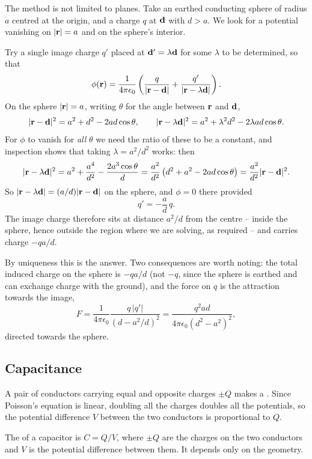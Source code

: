 \documentclass[a4paper]{scrartcl}
\begin{document}
\begin{example}
	The method is not limited to planes. Take an earthed conducting sphere of radius $a$ centred at the origin, and a charge $q$ at $\mathbf{d}$ with $d > a$. We look for a potential vanishing on $|\mathbf{r}| = a$ and on the sphere's interior.

	Try a single image charge $q'$ placed at $\mathbf{d}' = \lambda \mathbf{d}$ for some $\lambda$ to be determined, so that
	$$
	\phi(\mathbf{r}) = \frac{1}{4\pi\epsilon_0}\left(\frac{q}{|\mathbf{r}-\mathbf{d}|} + \frac{q'}{|\mathbf{r}-\lambda \mathbf{d}|}\right).
	$$
	On the sphere $|\mathbf{r}| = a$, writing $\theta$ for the angle between $\mathbf{r}$ and $\mathbf{d}$,
	$$
	|\mathbf{r}-\mathbf{d}|^2 = a^2 + d^2 - 2ad\cos\theta, \qquad |\mathbf{r}-\lambda\mathbf{d}|^2 = a^2 + \lambda^2 d^2 - 2\lambda a d \cos\theta.
	$$
	For $\phi$ to vanish for \emph{all} $\theta$ we need the ratio of these to be a constant, and inspection shows that taking $\lambda = a^2/d^2$ works: then
	$$
	|\mathbf{r}-\lambda\mathbf{d}|^2 = a^2 + \frac{a^4}{d^2} - \frac{2a^3\cos\theta}{d} = \frac{a^2}{d^2}\left(d^2 + a^2 - 2ad\cos\theta\right) = \frac{a^2}{d^2}|\mathbf{r}-\mathbf{d}|^2.
	$$
	So $|\mathbf{r}-\lambda\mathbf{d}| = (a/d)|\mathbf{r}-\mathbf{d}|$ on the sphere, and $\phi = 0$ there provided
	$$
	q' = -\frac{a}{d}\,q.
	$$
	The image charge therefore sits at distance $a^2/d$ from the centre -- inside the sphere, hence outside the region where we are solving, as required -- and carries charge $-qa/d$.

	By uniqueness this is the answer. Two consequences are worth noting: the total induced charge on the sphere is $-qa/d$ (not $-q$, since the sphere is earthed and can exchange charge with the ground), and the force on $q$ is the attraction towards the image,
	$$
	F = \frac{1}{4\pi\epsilon_0}\frac{q\,|q'|}{(d - a^2/d)^2} = \frac{q^2 a d}{4\pi\epsilon_0 (d^2-a^2)^2},
	$$
	directed towards the sphere.
\end{example}

\subsection{Capacitance}

A pair of conductors carrying equal and opposite charges $\pm Q$ makes a . Since Poisson's equation is linear, doubling all the charges doubles all the potentials, so the potential difference $V$ between the two conductors is proportional to $Q$.

\begin{definition}[Capacitance]
	The  of a capacitor is $C = Q/V$, where $\pm Q$ are the charges on the two conductors and $V$ is the potential difference between them. It depends only on the geometry.
\end{definition}
\end{document}
